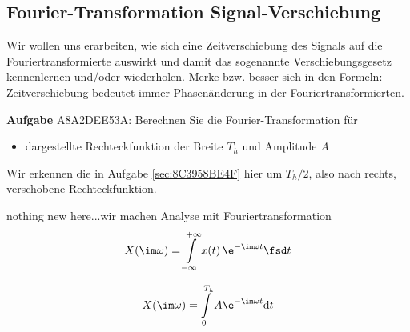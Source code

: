 \subsection{Fourier-Transformation Signal-Verschiebung}
\label{sec:A8A2DEE53A}
\begin{Ziel}
Wir wollen uns erarbeiten, wie sich eine Zeitverschiebung des Signals auf die
Fouriertransformierte auswirkt und damit das sogenannte Verschiebungsgesetz
kennenlernen und/oder wiederholen.
Merke bzw. besser sieh in den Formeln:
Zeitverschiebung bedeutet immer Phasenänderung in der Fouriertransformierten.
\end{Ziel}
\textbf{Aufgabe} {\tiny A8A2DEE53A}: Berechnen Sie die Fourier-Transformation für
\begin{itemize}
\item dargestellte Rechteckfunktion der Breite $T_h$ und Amplitude $A$
\end{itemize}
%
\begin{figure}[h!]
\centering
{}
\end{figure}
%
Wir erkennen die in Aufgabe \ref{sec:8C3958BE4F} hier um $T_h/2$, also nach rechts,
verschobene Rechteckfunktion.


\begin{Werkzeug}
nothing new here...wir machen
Analyse mit Fouriertransformation
\begin{align}
X(\im \omega) = \int\limits_{-\infty}^{+\infty} x(t) \, \e^{-\im \omega t} \fsd t
\end{align}
\end{Werkzeug}
\begin{Ansatz}
\begin{equation}
X(\im \omega) = \int\limits_{0}^{T_h} A \e^{-\im \omega t} \mathrm{d}t
\end{equation}
\end{Ansatz}



